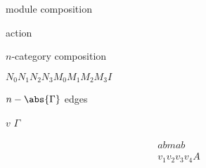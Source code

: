 \documentclass{amsart}
\begin{document}
\thispagestyle{empty}

module composition

action

$n$-category composition

\newcommand{\cN}{\mathcal{N}}
$N_0 N_1 N_2 N_3 M_0 M_1 M_2 M_3 I$

$n-\abs{\Gamma}$ edges

$v$
$\Gamma$

\begin{align*}
abmab & \\
v_1 v_2 v_3 v_4 A
\end{align*}
\end{document}
